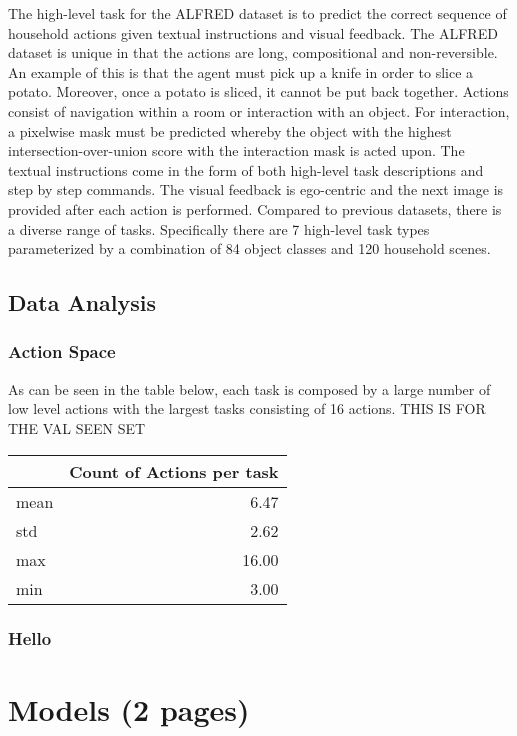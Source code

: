 \documentclass[11pt,a4paper]{article}
\begin{document}
The high-level task for the ALFRED dataset is to predict the correct sequence of household actions given textual instructions and visual feedback. The ALFRED dataset is unique in that the actions are long, compositional and non-reversible. An example of this is that the agent must pick up a knife in order to slice a potato. Moreover, once a potato is sliced, it cannot be put back together. Actions consist of navigation within a room or interaction with an object. For interaction, a pixelwise mask must be predicted whereby the object with the highest intersection-over-union score with the interaction mask is acted upon. The textual instructions come in the form of both high-level task descriptions and step by step commands. The visual feedback is ego-centric and the next image is provided after each action is performed. Compared to previous datasets, there is a diverse range of tasks. Specifically there are 7 high-level task types parameterized by a combination of 84 object classes and 120 household scenes.

\subsection{Data Analysis}

\subsubsection{Action Space}

As can be seen in the table below, each task is composed by a large number of low level actions with the largest tasks consisting of 16 actions. THIS IS FOR THE VAL SEEN SET 

\begin{tabular}{lr}
\toprule
{} &  Count of Actions per task \\
\midrule
mean &          6.47 \\
std  &          2.62 \\
max  &         16.00 \\
min  &          3.00 \\
\bottomrule
\end{tabular}


\subsubsection{Hello}


\clearpage
\section{Models (2 pages)}
\end{document}
